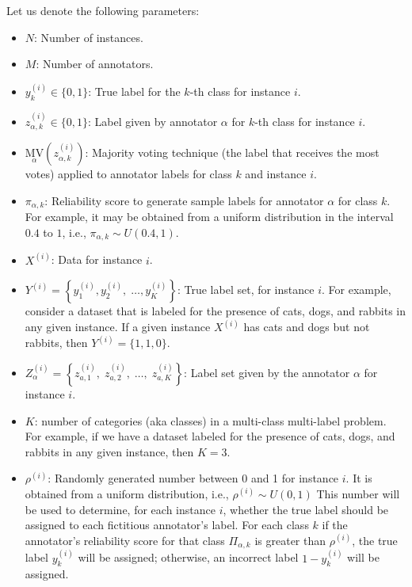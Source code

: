 Let us denote the following parameters:

\begin{itemize}
\renewcommand{\textbullet}{}
    \item  $N$: Number of instances.

    \item  $M$: Number of annotators.

    \item  $y_k^{(i)} \in \{0,1\} $: True label for the $k $-th class for instance $i $.

    \item  $z_{\alpha,k}^{(i)} \in \{0,1\} $: Label given by annotator $\alpha $ for $k $-th class for instance $i $.

    \item  ${{\underset\alpha{\mathrm{MV}}}{\left(z_{\alpha,k}^{(i)}\right)}} $: Majority voting technique (the label that receives the most votes) applied to annotator labels for class $k $ and instance $i $.

    \item  $\pi_{\alpha,k} $: Reliability score to generate sample labels for annotator $\alpha $ for class $k $. For example, it may be obtained from a uniform distribution in the interval $0.4 $ to $1 $, i.e., $\pi_{\alpha,k} \sim U(0.4,1) $.

    \item  $X^{(i)} $: Data for instance $i$.

    \item  $Y^{(i)}=\left\{y_1^{(i)},y_2^{(i)},\;\dots,y_{K}^{(i)}\right\} $: True label set, for instance $i $. For example, consider a dataset that is labeled for the presence of cats, dogs, and rabbits in any given instance. If a given instance $X^{(i)} $ has cats and dogs but not rabbits, then $Y^{(i)}=\{1,1,0\} $.

    \item  $Z_{\alpha}^{(i)}=\left\{z_{a,1}^{(i)},\;z_{a,2}^{(i)},\;\dots,\;z_{a,K}^{(i)}\right\} $: Label set given by the annotator $\alpha $ for instance $i $.

    \item $K$: number of categories (aka classes) in a multi-class multi-label problem. For example, if we have a dataset labeled for the presence of cats, dogs, and rabbits in any given instance, then $K=3$.

    \item  $\rho^{(i)}$: Randomly generated number  between 0 and 1 for instance $i $. It is obtained from a uniform distribution, i.e., $\rho^{(i)} \sim U(0,1) $ This number will be used to determine, for each instance $i$, whether the true label should be assigned to each fictitious annotator's label. For each class $k$ if the annotator's reliability score for that class ${\Pi}_{\alpha,k}$ is greater than $\rho^{(i)}$, the true label $y_k^{(i)}$ will be assigned; otherwise, an incorrect label $1 - y_k^{(i)}$  will be assigned.


\end{itemize}
